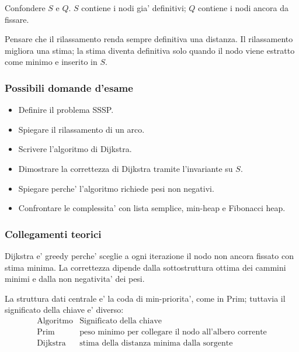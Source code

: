 \begin{hardnote}
Confondere $S$ e $Q$. $S$ contiene i nodi gia' definitivi; $Q$ contiene i nodi ancora da fissare.
\end{hardnote}

\begin{hardnote}
Pensare che il rilassamento renda sempre definitiva una distanza. Il rilassamento migliora una stima; la stima diventa definitiva solo quando il nodo viene estratto come minimo e inserito in $S$.
\end{hardnote}

\subsubsection{Possibili domande d'esame}
\begin{itemize}
	\item Definire il problema SSSP.
	\item Spiegare il rilassamento di un arco.
	\item Scrivere l'algoritmo di Dijkstra.
	\item Dimostrare la correttezza di Dijkstra tramite l'invariante su $S$.
	\item Spiegare perche' l'algoritmo richiede pesi non negativi.
	\item Confrontare le complessita' con lista semplice, min-heap e Fibonacci heap.
\end{itemize}

\subsubsection{Collegamenti teorici}
Dijkstra e' greedy perche' sceglie a ogni iterazione il nodo non ancora fissato con stima minima. La correttezza dipende dalla sottostruttura ottima dei cammini minimi e dalla non negativita' dei pesi.

La struttura dati centrale e' la coda di min-priorita', come in Prim; tuttavia il significato della chiave e' diverso:
\[
\begin{array}{c|c}
\text{Algoritmo} & \text{Significato della chiave} \\
\hline
\text{Prim} & \text{peso minimo per collegare il nodo all'albero corrente} \\
\text{Dijkstra} & \text{stima della distanza minima dalla sorgente}
\end{array}
\]

